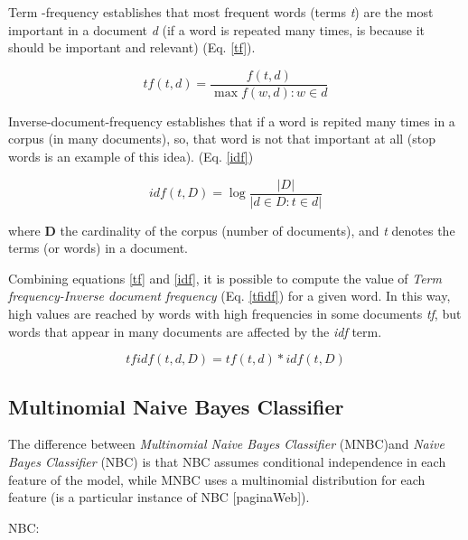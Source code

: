 Term -frequency establishes that most frequent words (terms \textit{t}) are the most important in a document \textit{d} (if a word is repeated many times, is because it should be important and relevant) (Eq. \ref{tf}).

\begin{center}
\begin{equation}
\label{tf}
	tf(t,d) = \frac{f(t,d)}{\max{f(w,d) : w \in d}}
\end{equation}
\end{center}

Inverse-document-frequency establishes that if a word is repited many times in a corpus (in many documents), so, that word is not that important at all (stop words is an example of this idea). (Eq. \ref{idf})

\begin{center}
\begin{equation}
\label{idf}
idf(t,D) = \log \frac{|D|}{| d \in D : t \in d |}
\end{equation}
\end{center}

where \textbf{D} the cardinality of the corpus (number of documents), and \textit{t} denotes the terms (or words) in a document.  


Combining equations \ref{tf} and \ref{idf}, it is possible to compute the value of \textit{Term frequency-Inverse document frequency} (Eq. \ref{tfidf}) for a given word. In this way, high values are reached by words with high frequencies in some documents \textit{tf}, but words that appear in many documents are affected by the \textit{idf} term.

\begin{center}
\begin{equation}
\label{tfidf}
tfidf(t,d,D) = tf(t,d) * idf(t,D)
\end{equation}
\end{center}

\subsection{Multinomial Naive Bayes Classifier}
The difference between \textit{Multinomial Naive Bayes Classifier} (MNBC)and \textit{Naive Bayes Classifier} (NBC) is that NBC assumes conditional independence in each feature of the model, while MNBC uses a multinomial distribution for each feature (is a particular instance of NBC [paginaWeb]). 

NBC:

